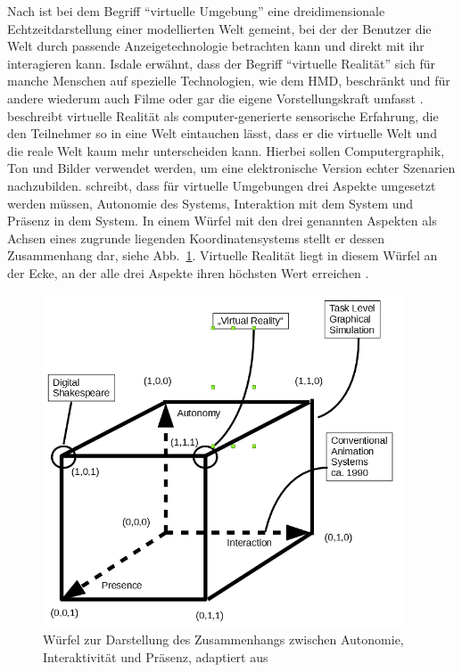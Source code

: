 \documentclass[12pt, a4paper]{article}
\begin{document}
Nach  ist bei dem Begriff "`virtuelle Umgebung"' eine dreidimensionale Echtzeitdarstellung einer modellierten Welt gemeint, bei der der Benutzer die Welt durch passende Anzeigetechnologie betrachten kann und direkt mit ihr interagieren kann. Isdale erwähnt, dass der Begriff "`virtuelle Realität"' sich für manche Menschen auf spezielle Technologien, wie dem HMD, beschränkt und für andere wiederum auch Filme oder gar die eigene Vorstellungskraft umfasst \cite{isdale1998virtual}.  beschreibt virtuelle Realität als computer-generierte sensorische Erfahrung, die den Teilnehmer so in eine Welt eintauchen lässt, dass er die virtuelle Welt und die reale Welt kaum mehr unterscheiden kann. Hierbei sollen Computergraphik, Ton und Bilder verwendet werden, um eine elektronische Version echter Szenarien nachzubilden.  schreibt, dass für virtuelle Umgebungen drei Aspekte umgesetzt werden müssen, Autonomie des Systems, Interaktion mit dem System und Präsenz in dem System. In einem Würfel mit den drei genannten Aspekten als Achsen eines zugrunde liegenden Koordinatensystems stellt er dessen Zusammenhang dar, siehe Abb.~\ref{zeltzerCube}. Virtuelle Realität liegt in diesem Würfel an der Ecke, an der alle drei Aspekte ihren höchsten Wert erreichen \cite[S.~129]{zeltzer1992autonomy}.\\

\begin{figure}[h!]
\centering
\includegraphics[width=0.95\textwidth]{zeltzersCube.png}
\caption[Würfel zur Darstellung des Zusammenhangs zwischen Autonomie, Interaktivität und Präsenz]{Würfel zur Darstellung des Zusammenhangs zwischen Autonomie, Interaktivität und Präsenz, adaptiert aus~\protect{}}
\label{zeltzerCube}
\end{figure}
\end{document}
